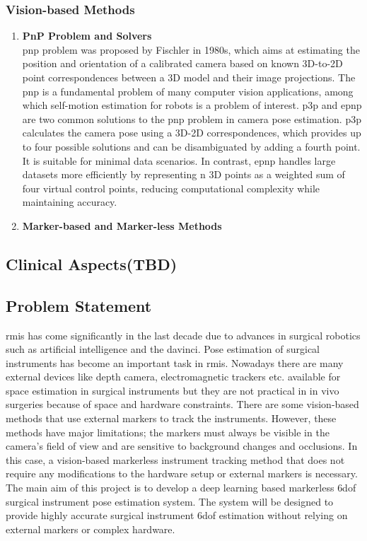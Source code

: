 \documentclass[12pt]{article}
\begin{document}
\subsubsection{Vision-based Methods}
\begin{enumerate}
      \item \textbf{PnP Problem and Solvers}
      \\\gls{pnp} problem was proposed by Fischler in 1980s, which aims at estimating the position and orientation of a calibrated camera based on known 3D-to-2D point correspondences between a 3D model and their image projections\cite{Fischler1981RandomSC}. The \gls{pnp} is a fundamental problem of many computer vision applications, among which self-motion estimation for robots is a problem of interest.
      \gls{p3p} and \gls{epnp} are two common solutions to the \gls{pnp} problem in camera pose estimation\cite{Lu_2018}. \gls{p3p} calculates the camera pose using a 3D-2D correspondences, which provides up to four possible solutions and can be disambiguated by adding a fourth point. It is suitable for minimal data scenarios. In contrast, \gls{epnp} handles large datasets more efficiently by representing n 3D points as a weighted sum of four virtual control points, reducing computational complexity while maintaining accuracy\cite{10.1007/s11263-008-0152-6}.
      \item \textbf{Marker-based and Marker-less Methods}
      
\end{enumerate}

\subsection{Clinical Aspects(TBD)}

\subsection{Problem Statement}
\gls{rmis} has come significantly in the last decade due to advances in surgical robotics such as artificial intelligence and the \gls{davinci}. Pose estimation of surgical instruments has become an important task in \gls{rmis}. 
Nowadays there are many external devices like depth camera, electromagnetic trackers etc. available for space estimation in surgical instruments but they are not practical in in vivo surgeries because of space and hardware constraints\cite{enhancedmarker}. There are some vision-based methods that use external markers to track the instruments. However, these methods have major limitations; the markers must always be visible in the camera's field of view and are sensitive to background changes and occlusions\cite{10160287}. In this case, a vision-based markerless instrument tracking method that does not require any modifications to the hardware setup or external markers is necessary. The main aim of this project is to develop a deep learning based markerless \gls{6dof} surgical instrument pose estimation system. The system will be designed to provide highly accurate surgical instrument \gls{6dof} estimation without relying on external markers or complex hardware.
\end{document}
